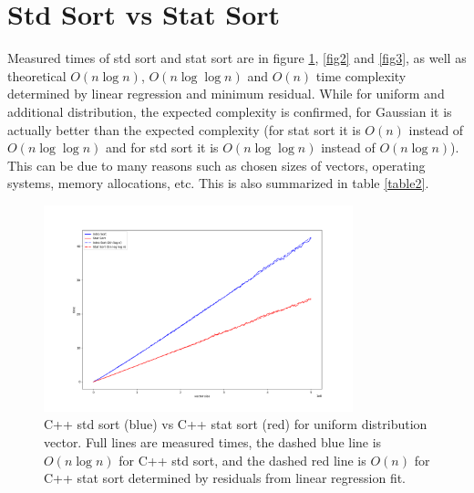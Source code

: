 \documentclass[12pt]{article}
\begin{document}
	\section{Std Sort vs Stat Sort}
	
		Measured times of std sort and stat sort are in figure \ref{fig1}, \ref{fig2} and \ref{fig3}, as well as theoretical $O(n \log n)$, $O(n \log \log n)$ and $O(n)$ time complexity determined by linear regression and minimum residual. While for uniform and additional distribution, the expected complexity is confirmed, for Gaussian it is actually better than the expected complexity (for stat sort it is $O(n)$ instead of $O(n \log \log n)$ and for std sort it is $O(n \log \log n)$ instead of $O(n \log n)$). This can be due to many reasons such as chosen sizes of vectors, operating systems, memory allocations, etc. This is also summarized in table \ref{table2}.

		\begin{figure}
		\begin{center}
			\includegraphics[width=0.8\textwidth]{fig_perf_uniform}
		\end{center}
			\caption{C++ std sort (blue) vs C++ stat sort (red) for uniform distribution vector. Full lines are measured times, the dashed blue line is $O(n \log n)$ for C++ std sort, and the dashed red line is $O(n)$ for C++ stat sort determined by residuals from linear regression fit.}
		
		\label{fig1}
		\end{figure}		
\end{document}

